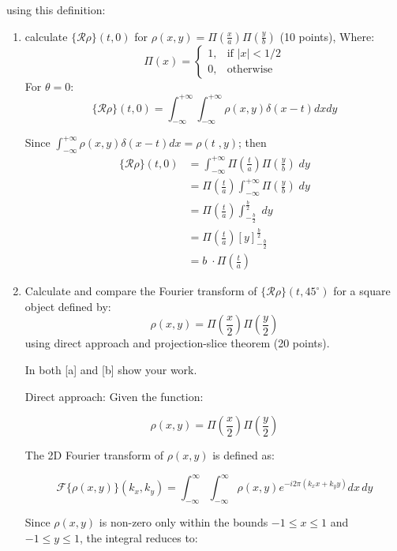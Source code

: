 \documentclass[12pt,twoside]{article}
\begin{document}
  using this definition:
    \begin{enumerate}
        \item calculate $\{ \mathcal{R} \rho \}(t, 0)$ for $\rho(x, y) = \Pi\left(\frac{x}{a}\right)\Pi\left(\frac{y}{b}\right)$ (10 points), Where:
        \[
        \Pi(x) = 
        \begin{cases} 
        1, & \text{if } |x| < 1/2 \\ 
        0, & \text{otherwise}
        \end{cases}
        \]
        For $\theta=0$:
	\begin{equation}
            \{ \mathcal{R} \rho \}(t, 0) = \int_{-\infty}^{+\infty} \int_{-\infty}^{+\infty} \rho(x, y) \delta(x  - t) dx dy
	\end{equation}

	Since $ \int_{-\infty}^{+\infty}  \rho (x ,y) \delta(x  - t) dx =  \rho (t \; , y)$; then 
	 \begin{align*}
	 	 	\{ \mathcal{R} \rho \}(t, 0) &= \int_{-\infty}^{+\infty} \Pi(\frac{t}{a}) \Pi(\frac{y}{b}) \; dy \\
			&= \Pi(\frac{t}{a}) \int_{-\infty}^{+\infty}  \Pi(\frac{y}{b}) \; dy \\
			&= \Pi(\frac{t}{a}) \int_{-\frac{b}{2}}^{\frac{b}{2}} \; dy \\
			&= \Pi(\frac{t}{a})  [ y ]_{-\frac{b}{2}}^{\frac{b}{2}}  \\
			&= b \; \cdot  \Pi(\frac{t}{a})  
	 \end{align*}

        \item Calculate and compare the Fourier transform of $\{ \mathcal{R} \rho \}(t, 45^{\circ})$ for a square object defined by:
        \[
        \rho(x, y) = \Pi\left(\frac{x}{2}\right)\Pi\left(\frac{y}{2}\right)
        \]
        using direct approach and projection-slice theorem (20 points).
        
        In both [a] and [b] show your work.
        
        Direct approach:  
     Given the function:

\[
\rho(x,y) = \Pi\left(\frac{x}{2}\right)\Pi\left(\frac{y}{2}\right)
\]

The 2D Fourier transform of $\rho(x,y)$ is defined as:

\[
\mathcal{F}\{\rho(x,y)\}(k_x, k_y) = \int_{-\infty}^{\infty}\int_{-\infty}^{\infty} \rho(x,y) e^{-i 2\pi(k_x x + k_y y)} dx\, dy
\]

Since $\rho(x,y)$ is non-zero only within the bounds $-1 \leq x \leq 1$ and $-1 \leq y \leq 1$, the integral reduces to:


\end{enumerate}
\end{document}
